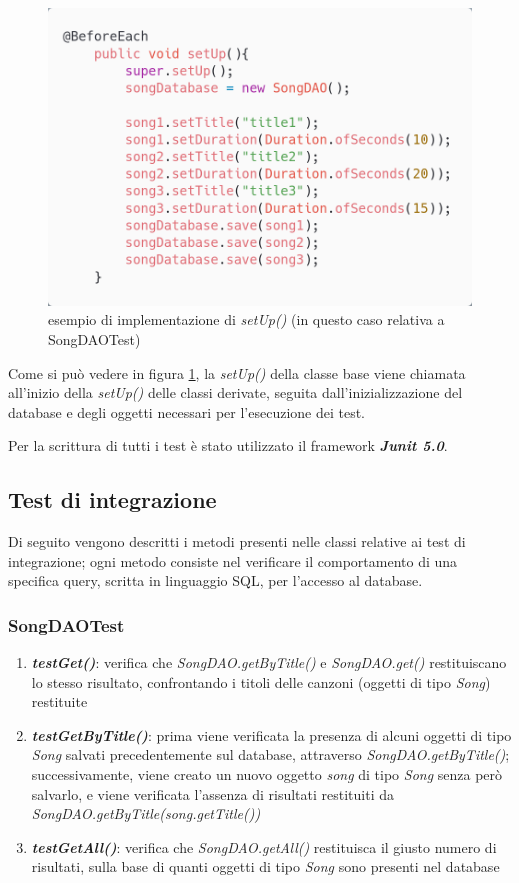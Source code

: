 \documentclass{article}
\begin{document}
  \begin{figure}[H]
    \centering
    \includegraphics[width=0.5\linewidth]{setUp.png}
    \caption{esempio di implementazione di \textit{setUp()} (in questo caso relativa a SongDAOTest)}
    \label{fig:setUp}
  \end{figure}


  Come si può vedere in figura \ref{fig:setUp}, la \textit{setUp()} della classe base viene chiamata all'inizio della \textit{setUp()} delle classi
  derivate, seguita dall'inizializzazione del database e degli oggetti necessari per l'esecuzione dei test.

  Per la scrittura di tutti i test è stato utilizzato il framework \textbf{\textit{Junit 5.0}}.

  \subsection{Test di integrazione}
  Di seguito vengono descritti i metodi presenti nelle classi relative ai test di integrazione; ogni metodo consiste nel verificare il comportamento di una specifica query, scritta in linguaggio SQL, per l'accesso al database.

  \subsubsection{SongDAOTest}
  \begin{enumerate}

    \item \textbf{\textit{testGet()}}: verifica che \textit{SongDAO.getByTitle()} e \textit{SongDAO.get()} restituiscano lo stesso risultato, confrontando i titoli delle canzoni (oggetti di tipo \textit{Song}) restituite

    \item \textbf{\textit{testGetByTitle()}}: prima viene verificata la presenza di alcuni oggetti di tipo \textit{Song} salvati precedentemente sul database, attraverso \textit{SongDAO.getByTitle()}; successivamente, viene creato un nuovo oggetto \textit{song} di tipo \textit{Song} senza però salvarlo, e viene verificata l'assenza di risultati restituiti da \textit{SongDAO.getByTitle(song.getTitle())}

    \item \textbf{\textit{testGetAll()}}: verifica che \textit{SongDAO.getAll()} restituisca il giusto numero di risultati, sulla base di quanti oggetti di tipo \textit{Song} sono presenti nel database

  \end{enumerate}
\end{document}
